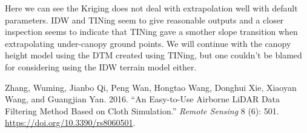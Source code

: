 \documentclass[
]{article}
\newlength{\cslhangindent}
\newlength{\cslentryspacingunit} %
\newenvironment{CSLReferences}[2] %
 {%
  \setlength{\parindent}{0pt}
  \ifodd #1
  \let\oldpar\par
  \def\par{\hangindent=\cslhangindent\oldpar}
  \fi
  \setlength{\parskip}{#2\cslentryspacingunit}
 }%
 {}
\begin{document}
Here we can see the Kriging does not deal with extrapolation well with
default parameters. IDW and TINing seem to give reasonable outputs and a
closer inspection seems to indicate that TINing gave a smother slope
transition when extrapolating under-canopy ground points. We will
continue with the canopy height model using the DTM created using
TINing, but one couldn't be blamed for considering using the IDW terrain
model either.

\hypertarget{refs}{}
\begin{CSLReferences}{1}{0}
\leavevmode{}%
Zhang, Wuming, Jianbo Qi, Peng Wan, Hongtao Wang, Donghui Xie, Xiaoyan
Wang, and Guangjian Yan. 2016. {``An Easy-to-Use Airborne LiDAR Data
Filtering Method Based on Cloth Simulation.''} \emph{Remote Sensing} 8
(6): 501. \url{https://doi.org/10.3390/rs8060501}.

\end{CSLReferences}
\end{document}
